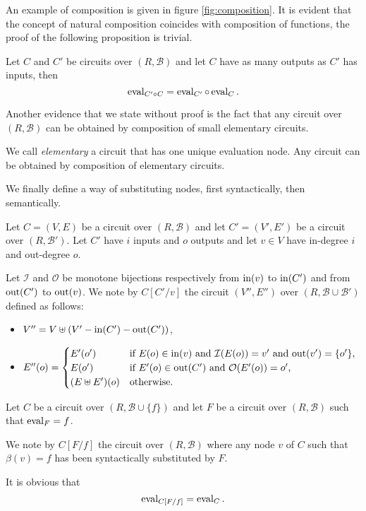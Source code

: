 An example of composition is given in figure \ref{fig:composition}.
It is evident that the concept of natural composition coincides with
composition of functions, the proof of the following proposition is
trivial.

\begin{proposition}
  Let $C$ and $C'$ be circuits over $(R,\mathcal{B})$ and let $C$
  have as many outputs as $C'$ has inputs, then
  \[\operatorname{eval}_{C'\circ C} = \operatorname{eval}_{C'}\circ\operatorname{eval}_{C} \text{.}\]
\end{proposition}

Another evidence that we state without proof is the fact that any
circuit over $(R,\mathcal{B})$ can be obtained by composition of small
elementary circuits.

\begin{proposition}
  We call \emph{elementary} a circuit that has one unique evaluation
  node. Any circuit can be obtained by composition of elementary
  circuits.
\end{proposition}

We finally define a way of substituting nodes, first syntactically,
then semantically.

\begin{definition}
  Let $C=(V,E)$ be a circuit over $(R,\mathcal{B})$ and let
  $C'=(V',E')$ be a circuit over $(R,\mathcal{B}')$. Let $C'$ have $i$
  inputs and $o$ outputs and let $v\in V$ have in-degree $i$ and
  out-degree $o$. 

  Let $\mathcal{I}$ and $\mathcal{O}$ be monotone bijections
  respectively from $\operatorname{in}(v)$ to $\operatorname{in}(C')$ and from $\operatorname{out}(C')$ to
  $\operatorname{out}(v)$. We note by $C[C'/v]$ the circuit $(V'',E'')$ over
  $(R,\mathcal{B}\cup\mathcal{B}')$ defined as follows:
  \begin{itemize}
  \item $V'' = V\uplus (V' - \operatorname{in}(C') - \operatorname{out}(C'))$,
  \item $E''(o) = \begin{cases}
      E'(o') & \text{if $E(o)\in\operatorname{in}(v)$ and $\mathcal{I}(E(o))=v'$ and $\operatorname{out}(v')=\{o'\}$,}\\
      E(o') & \text{if $E'(o)\in\operatorname{out}(C')$ and $\mathcal{O}(E'(o))=o'$,}\\
      (E\uplus E')(o) & \text{otherwise.}
    \end{cases}$
  \end{itemize}
\end{definition}

\begin{definition}
  Let $C$ be a circuit over $(R,\mathcal{B}\cup\{f\})$ and let $F$ be
  a circuit over $(R,\mathcal{B})$ such that $\operatorname{eval}_F=f$.

  We note by $C[F/f]$ the circuit over $(R,\mathcal{B})$ where any
  node $v$ of $C$ such that $\beta(v)=f$ has been syntactically
  substituted by $F$.

  It is obvious that
  \[\operatorname{eval}_{C[F/f]} = \operatorname{eval}_C \text{.}\]
\end{definition}

